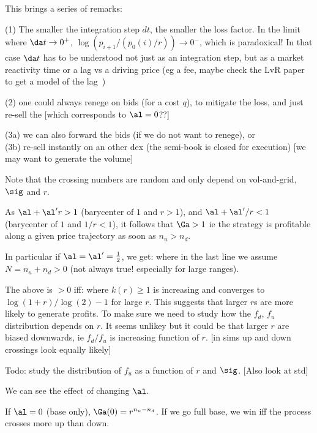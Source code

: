 \documentclass[oneside,12pt]{article}
\begin{document}
This brings a series of remarks:

(1) The smaller the integration step $dt$, the smaller the loss factor.
In the limit where $\da t\to0^+$, $\log(p_{i+1}/(p_0(i)/r))\to 0^-$, which is paradoxical!
In that case $\da t$ has to be understood not just as an integration step,
but as a market reactivity time or a lag vs a driving price 
(eg a fee, maybe check the LvR paper to get a model of the lag~\cite{milionis2022automated})

(2) one could always renege on bids (for a cost $q$), to mitigate the loss, 
and just re-sell the [which corresponds to $\al=0$??]

(3a) we can also forward the bids (if we do not want to renege), or 
\\(3b) re-sell instantly on an other dex (the semi-book is closed for execution) 
[we may want to generate the volume]

Note that the crossing numbers are random and only depend on vol-and-grid, $\sig$ and $r$.

As
$\al+\al' r>1$ (barycenter of $1$ and $r>1$), and  
$\al+\al'/r<1$ (barycenter of $1$ and $1/r<1$),
it follows that $\Ga>1$ ie the strategy is profitable along a given price trajectory as soon as $n_u>n_d$.

In particular if $\al=\al'=\frac12$, we get:
where in the last line we assume $N=n_u+n_d>0$ (not always true! especially for large ranges).

The above is $>0$ iff:
where $k(r)\geq 1$ is increasing and converges to $\log(1+r)/\log(2) -1$ for large $r$.
This suggests that  larger $r$s are more likely to generate profits. To make sure we need
to study how the $f_d$, $f_u$ distribution depends on $r$. It seems unlikey but it could be that larger $r$ are biased 
downwards, ie $f_d/f_u$ is increasing function of $r$. [in sims up and down crossings 
look equally likely]

Todo: study the distribution of $f_u$ as a function of $r$ and $\sig$. [Also look at std]

We can see the effect of changing $\al$.

If $\al=0$ (base only), $\Ga(0) = r^{n_u-n_d}$. If we go full base,
we win iff the process crosses more up than down.
\end{document}
